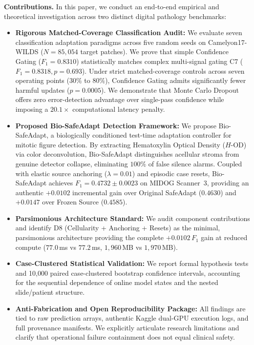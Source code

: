 \documentclass[conference]{IEEEtran}
\begin{document}
\textbf{Contributions.} In this paper, we conduct an end-to-end empirical and theoretical investigation across two distinct digital pathology benchmarks:
\begin{itemize}
    \item \textbf{Rigorous Matched-Coverage Classification Audit:} We evaluate seven classification adaptation paradigms across five random seeds on Camelyon17-WILDS ($N=85{,}054$ target patches). We prove that simple Confidence Gating ($F_1 = 0.8310$) statistically matches complex multi-signal gating C7 ($F_1 = 0.8318, p=0.693$). Under strict matched-coverage controls across seven operating points ($30\%$ to $80\%$), Confidence Gating admits significantly fewer harmful updates ($p=0.0005$). We demonstrate that Monte Carlo Dropout offers zero error-detection advantage over single-pass confidence while imposing a $20.1\times$ computational latency penalty.
    \item \textbf{Proposed Bio-SafeAdapt Detection Framework:} We propose Bio-SafeAdapt, a biologically conditioned test-time adaptation controller for mitotic figure detection. By extracting Hematoxylin Optical Density ($H\text{-OD}$) via color deconvolution, Bio-SafeAdapt distinguishes acellular stroma from genuine detector collapse, eliminating $100\%$ of false silence alarms. Coupled with elastic source anchoring ($\lambda = 0.01$) and episodic case resets, Bio-SafeAdapt achieves $F_1 = 0.4732 \pm 0.0023$ on MIDOG Scanner~3, providing an authentic $+0.0102$ incremental gain over Original SafeAdapt ($0.4630$) and $+0.0147$ over Frozen Source ($0.4585$).
    \item \textbf{Parsimonious Architecture Standard:} We audit component contributions and identify D8 (Cellularity + Anchoring + Resets) as the minimal, parsimonious architecture providing the complete $+0.0102$\,$F_1$ gain at reduced compute ($77.0$\,ms vs $77.2$\,ms, $1{,}960$\,MB vs $1{,}970$\,MB).
    \item \textbf{Case-Clustered Statistical Validation:} We report formal hypothesis tests and 10,000 paired case-clustered bootstrap confidence intervals, accounting for the sequential dependence of online model states and the nested slide/patient structure.
    \item \textbf{Anti-Fabrication and Open Reproducibility Package:} All findings are tied to raw prediction arrays, authentic Kaggle dual-GPU execution logs, and full provenance manifests. We explicitly articulate research limitations and clarify that operational failure containment does not equal clinical safety.
\end{itemize}
\end{document}
